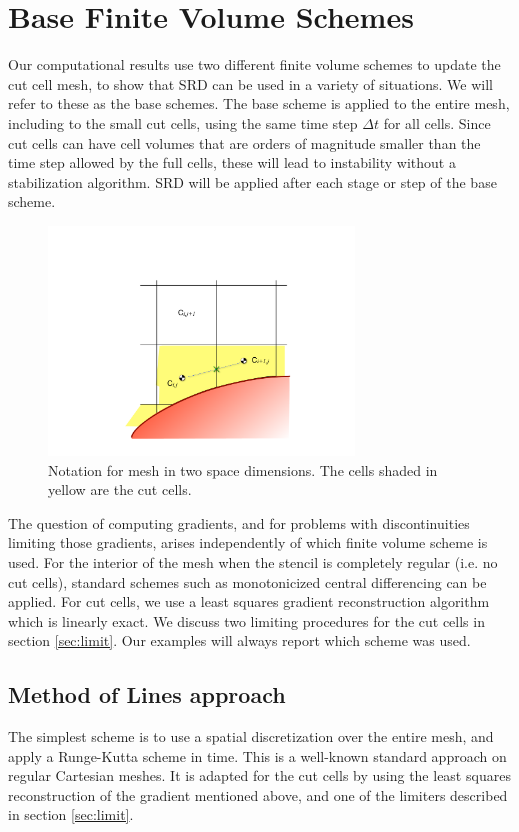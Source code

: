 \section{Base Finite Volume Schemes}\label{sec:basefv}

Our computational results use two different finite volume schemes
to update the cut cell mesh, to show that SRD can be used in a
variety of situations.
We will refer to these as the base schemes. 
The  base scheme is applied to the entire mesh, including  
to the small cut cells, using the same time step $\Delta t$ for all cells.  
Since cut cells can have cell volumes that are
orders of magnitude smaller than the time step allowed by the full
cells, these will lead to instability without a stabilization algorithm.
SRD will be applied after each stage or step of the base scheme.

\begin{figure}
\begin{center}
\includegraphics[width=3.2in]{figs/2dfig.pdf}
\caption{\sf Notation for mesh in two space dimensions. The cells shaded
in yellow are the cut cells.} 
\label{fig:2dfig}
\end{center}
\end{figure}

The question of computing gradients, and for problems with discontinuities limiting
those gradients, arises independently of which finite volume scheme is used. 
For the interior of the mesh when the stencil is completely regular (i.e. no cut
cells), standard schemes such as monotonicized central differencing can be applied.
For cut cells, we use a least squares gradient reconstruction algorithm which is
linearly exact.  We discuss two  limiting procedures for the cut cells in 
section \ref{sec:limit}. Our examples will always report which scheme was used.


\subsection{Method of Lines approach}
The simplest scheme is to use a spatial discretization over the entire
mesh, and apply a Runge-Kutta scheme in time. This is a well-known
standard approach
on regular Cartesian meshes. It is adapted for the cut cells by
using the  least squares reconstruction of the gradient mentioned above, and one of
the limiters described in section \ref{sec:limit}.

